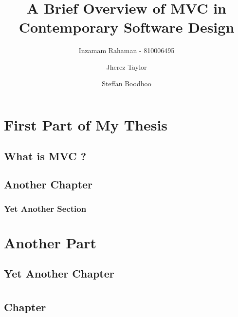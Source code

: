 \documentclass[
  oneside,
  openany,
  12pt, a4paper,
  footinclude=true,
  headinclude=true,
  cleardoublepage=empty
]{scrbook}
\title{A Brief Overview of MVC in Contemporary Software Design}
\author{Inzamam Rahaman - 810006495 \and Jherez Taylor \and Steffan Boodhoo}
\begin{document}
\maketitle

%
%
%
%


\doublespace
\part{First Part of My Thesis}

\chapter{What is MVC ?}



\chapter{Another Chapter}
\lipsum[1] %

\section{Yet Another Section}
\lipsum[1] %

\part{Another Part}

\chapter{Yet Another Chapter}
\lipsum[1] %
  

\part{}
\chapter{ Chapter}
\lipsum[1]
    
\end{document}
